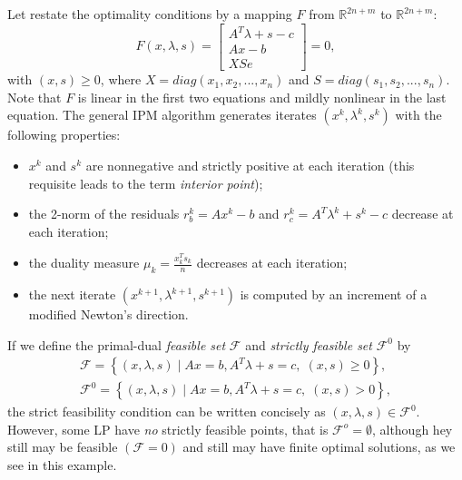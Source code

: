 \documentclass[a4paper,10 pt,titlepage,twoside]{book}
\theoremstyle{plain}
\theoremstyle{definition}
\theoremstyle{remark}
\begin{document}
 Let restate the optimality conditions by a mapping $\mathit{F}$ from $\mathbb{R}^{2n+m}$ to $\mathbb{R}^{2n+m}$:
\begin{equation}\label{F}
	\mathit{F}(x,\lambda,s)= \begin{bmatrix}
	A^{T}\lambda+s-c \\Ax-b \\XSe
	\end{bmatrix}=0,
\end{equation}
with $(x,s)\geq0$, where $X = diag(x_{1}, x_{2},...,x_{n})$ and $S = diag(s_{1}, s_{2},...,s_{n})$.\\
Note that $\mathit{F}$ is linear in the first two equations and mildly nonlinear in the last equation. 
The general IPM algorithm generates iterates $(x^{k},\lambda^{k},s^{k})$ with the following properties:
\begin{itemize}
	\item $x^{k}$ and $s^{k}$ are nonnegative and strictly positive at each iteration (this requisite leads to the term \textit{interior point});
	\item the 2-norm of the residuals $r_{b}^{k} = Ax^{k} - b$ and $r_{c}^{k} =A^{T}\lambda^{k} +s^{k} - c$ decrease at each iteration;
	\item the duality measure $\mu_{k} = \frac{x^{T}_{k}s_{k}}{n}$ decreases at each iteration;
	\item the next iterate $(x^{k+1},\lambda^{k+1},s^{k+1})$ is computed by an increment of a modified Newton's direction.
\end{itemize}
If we define the primal-dual \textit{feasible set} $\mathcal{F}$ and \textit{strictly feasible set} $\mathcal{F}^{0}$ by
\begin{align*}
\mathcal{F} = \left\lbrace(x,\lambda,s)\;|\;Ax = b, A^{T}\lambda+s =c,\;(x,s)\geq0\right\rbrace, \\
\mathcal{F}^{0} = \left\lbrace(x,\lambda,s)\;|\;Ax = b, A^{T}\lambda+s =c,\;(x,s)>0\right\rbrace, 
\end{align*}
the strict feasibility condition can be written concisely as $(x,\lambda,s)\in\mathcal{F}^{0}$.\\
However, some LP have \textit{no} strictly feasible points, that is $\mathcal{F}^{o}=\emptyset$, although hey still may be feasible $(\mathcal{F}=0)$ and still may have finite optimal solutions, as we see in this example.
\end{document}
